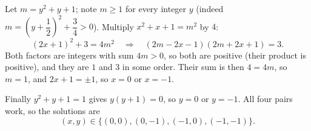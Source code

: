Let $m=y^2+y+1$; note $m\ge1$ for every integer $y$ (indeed $m=\left(y+\dfrac{1}{2}\right)^2+\dfrac{3}{4}>0$). Multiply $x^2+x+1=m^2$ by $4$:
\[(2x+1)^2+3=4m^2\quad\Longrightarrow\quad (2m-2x-1)(2m+2x+1)=3 .\]
Both factors are integers with sum $4m>0$, so both are positive (their product is positive), and they are $1$ and $3$ in some order. Their sum is then $4=4m$, so $m=1$, and $2x+1=\pm1$, so $x=0$ or $x=-1$.

Finally $y^2+y+1=1$ gives $y(y+1)=0$, so $y=0$ or $y=-1$. All four pairs work, so the solutions are
\[\boxed{(x,y)\in\{(0,0),(0,-1),(-1,0),(-1,-1)\}} .\]
